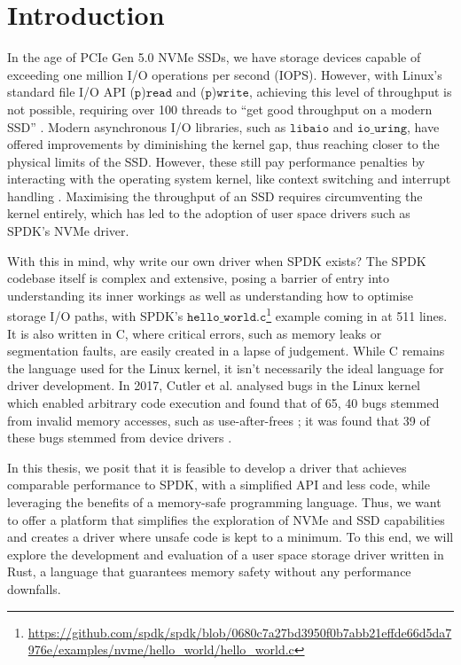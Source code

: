 \chapter{Introduction}\label{chapter:introduction}
In the age of PCIe Gen 5.0 NVMe SSDs, we have storage devices capable of exceeding one million I/O operations per second (IOPS). However, with Linux's standard file I/O API ($\texttt{p}$)$\texttt{read}$ and ($\texttt{p}$)$\texttt{write}$, achieving this level of throughput is not possible, requiring over 100 threads to ``get good throughput on a modern SSD'' \cite{haas2020exploiting}. Modern asynchronous I/O libraries, such as $\texttt{libaio}$ and $\texttt{io\_uring}$, have offered improvements by diminishing the kernel gap, thus reaching closer to the physical limits of the SSD. However, these still pay performance penalties by interacting with the operating system kernel, like context switching and interrupt handling \cite{storage_api}. Maximising the throughput of an SSD requires circumventing the kernel entirely, which has led to the adoption of user space drivers such as SPDK's NVMe driver.

With this in mind, why write our own driver when SPDK exists? The SPDK codebase itself is complex and extensive, posing a barrier of entry into understanding its inner workings as well as understanding how to optimise storage I/O paths, with SPDK's $\texttt{hello\_world.c}$\footnote{\url{https://github.com/spdk/spdk/blob/0680c7a27bd3950f0b7abb21effde66d5da7976e/examples/nvme/hello_world/hello_world.c}} example coming in at 511 lines. It is also written in C, where critical errors, such as memory leaks or segmentation faults, are easily created in a lapse of judgement. While C remains the language used for the Linux kernel, it isn't necessarily the ideal language for driver development. In 2017, Cutler et al. analysed bugs in the Linux kernel which enabled arbitrary code execution and found that of 65, 40 bugs stemmed from invalid memory accesses, such as use-after-frees \cite{cutler}; it was found that 39 of these bugs stemmed from device drivers \cite{driver_lang}.

In this thesis, we posit that it is feasible to develop a driver that achieves comparable performance to SPDK, with a simplified API and less code, while leveraging the benefits of a memory-safe programming language. Thus, we want to offer a platform that simplifies the exploration of NVMe and SSD capabilities and creates a driver where unsafe code is kept to a minimum. To this end, we will explore the development and evaluation of a user space storage driver written in Rust, a language that guarantees memory safety without any performance downfalls.

